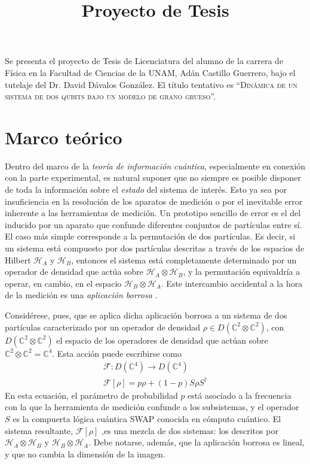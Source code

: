 \documentclass[onecolumn,11pt]{article}
\title{Proyecto de Tesis} \date{}
\newcommand{\mcH}{\mathcal{H}}
\newcommand{\mcF}{\mathcal{F}}
\newcommand{\Complex}{\mathbb{C}} %
\newcommand{\Fuzzy}[1]{\mcF\left[#1\right]}
\begin{document}
\maketitle
\thispagestyle{empty}
Se presenta el proyecto de Tesis de Licenciatura del alumno de la carrera de Física en la Facultad de Ciencias de la UNAM, Adán Castillo Guerrero, bajo el tutelaje del Dr. David Dávalos González. El título tentativo es ``\textsc{Dinámica de un sistema de dos qubits bajo un modelo de grano grueso}''.

\section{Marco teórico}


Dentro del marco de la \textit{teoría de información cuántica}, especialmente en conexión con la parte experimental, es natural suponer que no siempre es posible disponer de toda la información sobre el \textit{estado} del sistema de interés. Esto ya sea por insuficiencia en la resolución de los aparatos de medición o por el inevitable error inherente a las herramientas de medición. Un prototipo sencillo de error es el del inducido por un aparato que confunde diferentes conjuntos de partículas entre sí. El caso más simple corresponde a la permutación de dos partículas. Es decir, si un sistema está compuesto por dos partículas descritas a través de los espacios de Hilbert $\mcH_{A}$ y $\mcH_{B}$, entonces el sistema está completamente determinado por un operador de densidad que actúa sobre $\mcH_{A}\otimes\mcH_{B}$, y la permutación equivaldría a operar, en cambio, en el espacio $\mcH_{B}\otimes\mcH_{A}$. Este intercambio accidental a la hora de la medición es una \textit{aplicación borrosa} \cite{FuzzyMeasurements}.

Considérese, pues, que se aplica dicha aplicación borrosa a un sistema de dos partículas caracterizado por un operador de densidad $\rho\in D(\Complex^{2}\otimes\Complex^{2})$, con $D(\Complex^{2}\otimes\Complex^{2})$ el espacio de los operadores de densidad que actúan sobre $\Complex^{2}\otimes\Complex^{2}=\Complex^{4}$. Esta acción puede escribirse como
\begin{gather}
\mcF:D(\Complex^{4})\rightarrow D(\Complex^{4})\label{eq:Fuzzy2Domain}\\
\Fuzzy{\rho}=p\rho+(1-p)S\rho S^{\dag}\label{eq:Fuzzy2}
\end{gather}
En esta ecuación, el parámetro  de probabilidad $p$ está asociado a la frecuencia con la que la herramienta de medición confunde a los subsistemas, y el operador $S$ es la compuerta lógica cuántica SWAP conocida en cómputo cuántico. El sistema resultante, $\Fuzzy{\rho}$ ,es una mezcla de dos sistemas: los descritos por $\mcH_{A}\otimes\mcH_{B}$ y $\mcH_{B}\otimes\mcH_{A}$. Debe notarse, además, que la aplicación borrosa es lineal, y que no cambia la dimensión de la imagen.
\end{document}
